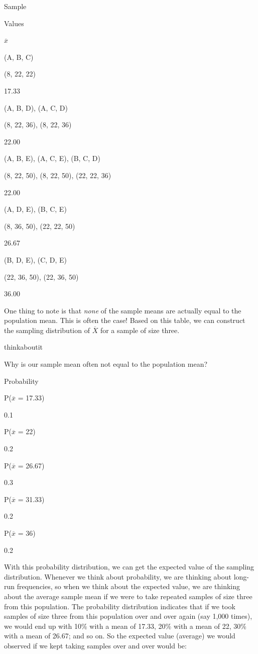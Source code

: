 \documentclass[
]{book}
\theoremstyle{definition}
\theoremstyle{definition}
\theoremstyle{definition}
\theoremstyle{remark}
\begin{document}
Sample

Values

\(\overline{x}\)

(A, B, C)

(8, 22, 22)

17.33

(A, B, D), (A, C, D)

(8, 22, 36), (8, 22, 36)

22.00

(A, B, E), (A, C, E), (B, C, D)

(8, 22, 50), (8, 22, 50), (22, 22, 36)

22.00

(A, D, E), (B, C, E)

(8, 36, 50), (22, 22, 50)

26.67

(B, D, E), (C, D, E)

(22, 36, 50), (22, 36, 50)

36.00

One thing to note is that \emph{none} of the sample means are actually equal to the population mean. This is often the case! Based on this table, we can construct the sampling distribution of \(\overline{X}\) for a sample of size three.

\begin{infobox}thinkaboutit

Why is our sample mean often not equal to the population mean?

\end{infobox}

Probability

P(\(\overline{x}\) = 17.33)

0.1

P(\(\overline{x}\) = 22)

0.2

P(\(\overline{x}\) = 26.67)

0.3

P(\(\overline{x}\) = 31.33)

0.2

P(\(\overline{x}\) = 36)

0.2

With this probability distribution, we can get the expected value of the sampling distribution. Whenever we think about probability, we are thinking about long-run frequencies, so when we think about the expected value, we are thinking about the average sample mean if we were to take repeated samples of size three from this population. The probability distribution indicates that if we took samples of size three from this population over and over again (say 1,000 times), we would end up with 10\% with a mean of 17.33, 20\% with a mean of 22, 30\% with a mean of 26.67; and so on. So the expected value (average) we would observed if we kept taking samples over and over would be:
\end{document}
